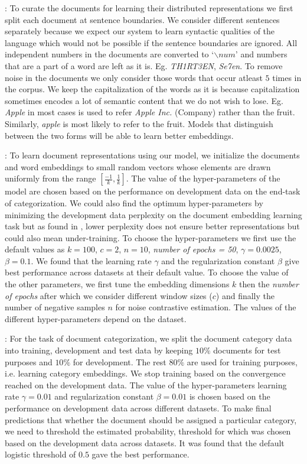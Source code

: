  : To curate the documents for learning their distributed representations we first split each document at sentence boundaries. We consider different sentences separately because we expect our system to learn syntactic qualities of the language which would not be possible if the sentence boundaries are ignored.
All independent numbers in the documents are converted to `$\backslash num$' and numbers that are a part of a word are left as it is. Eg. \emph{TH1RT3EN}, \emph{Se7en}. 
To remove noise in the documents we only consider those words that occur atleast $5$ times in the corpus.
We keep the capitalization of the words as it is because capitalization sometimes encodes a lot of semantic content that we do not wish to lose. Eg. \emph{Apple} in most cases is used to refer \emph{Apple Inc.} (Company) rather than the fruit. Similarly, \emph{apple} is most likely to refer to the fruit. Models that distinguish between the two forms will be able to learn better embeddings.

 : To learn document representations using our model, we initialize the documents and word embeddings to small random vectors whose elements are drawn uniformly from the range $[\frac{-1}{k}, \frac{1}{k}]$. 
The value of the hyper-parameters of the model are chosen based on the performance on development data on the end-task of categorization. We could also find the optimum hyper-parameters by minimizing the development data perplexity on the document embedding learning task but as found in \citep{mnih2013learning}, lower perplexity does not ensure better representations but could also mean under-training. To choose the hyper-parameters we first use the default values as $k = 100$, $c = 2$, $n = 10$, \emph{number of epochs = 50}, $\gamma = 0.0025$, $\beta = 0.1$. We found that the learning rate $\gamma$ and the regularization constant $\beta$ give best performance across datasets at their default value. To choose the value of the other parameters, we first tune the embedding dimensions $k$ then the \emph{number of epochs} after which we consider different window sizes ($c$) and finally the number of negative samples $n$ for noise contrastive estimation. The values of the different hyper-parameters depend on the dataset. 

 : For the task of document categorization, we split the document category data into training, development and test data by keeping $10\%$ documents for test purposes and $10\%$ for development. The rest $80\%$ are used for training purposes, i.e. learning category embeddings. We stop training based on the convergence reached on the development data. The value of the hyper-parameters learning rate $\gamma = 0.01$ and regularization constant $\beta = 0.01$ is chosen based on the performance on development data across different datasets. To make final predictions that whether the document should be assigned a particular category, we need to threshold the estimated probability, threshold for which was chosen based on the development data across datasets. It was found that the default logistic threshold of $0.5$ gave the best performance.

